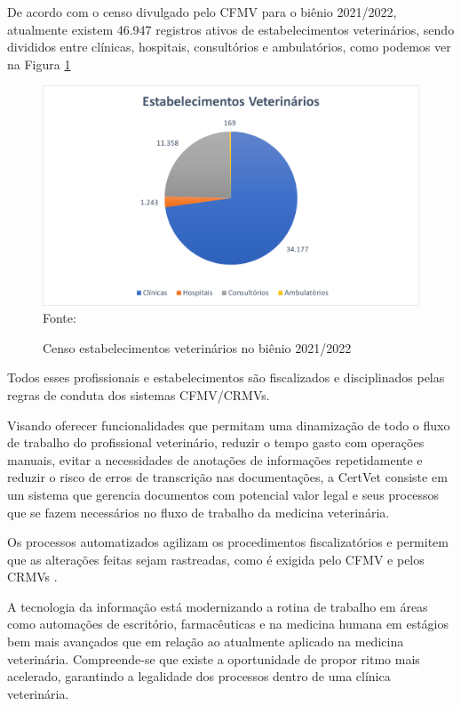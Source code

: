 \documentclass[
    12pt,               %
    openright,          %
    oneside,
    a4paper,            %
    BIBLATEX,           %
    TODO,               %
    english,            %
    brazil              %
    ]{ifsp-spo-inf-ctds}
\begin{document}
    De acordo com o censo divulgado pelo CFMV para o biênio 2021/2022, atualmente existem 46.947 registros ativos de estabelecimentos veterinários, sendo divididos entre clínicas, hospitais, consultórios e ambulatórios, como podemos ver na Figura \ref{fig:grafico clinicas} 

    \begin{figure}[H]
        \centering
        \caption{Censo estabelecimentos veterinários no biênio 2021/2022}
        \includegraphics{images/grafico_estabelecimento.png}
        \footnotesize{ Fonte: }
        \label{fig:grafico clinicas}
    \end{figure}

    Todos esses profissionais e estabelecimentos são fiscalizados e disciplinados pelas regras de conduta dos sistemas CFMV/CRMVs.

    Visando oferecer funcionalidades que permitam uma dinamização de todo o fluxo de trabalho do profissional veterinário, reduzir o tempo gasto com operações manuais, evitar a necessidades de anotações de informações repetidamente e reduzir o risco de erros de transcrição nas documentações, a CertVet consiste em um sistema que gerencia documentos com potencial valor legal e seus processos que se fazem necessários no fluxo de trabalho da medicina veterinária.

    Os processos automatizados agilizam os procedimentos fiscalizatórios e permitem que as alterações feitas sejam rastreadas, como é exigida pelo CFMV e pelos CRMVs .

    A tecnologia da informação está modernizando a rotina de trabalho em áreas como automações de escritório, farmacêuticas e na medicina humana em estágios bem mais avançados que em relação ao atualmente aplicado na medicina veterinária. Compreende-se que existe a oportunidade de propor ritmo mais acelerado, garantindo a legalidade dos processos dentro de uma clínica veterinária.
\end{document}
